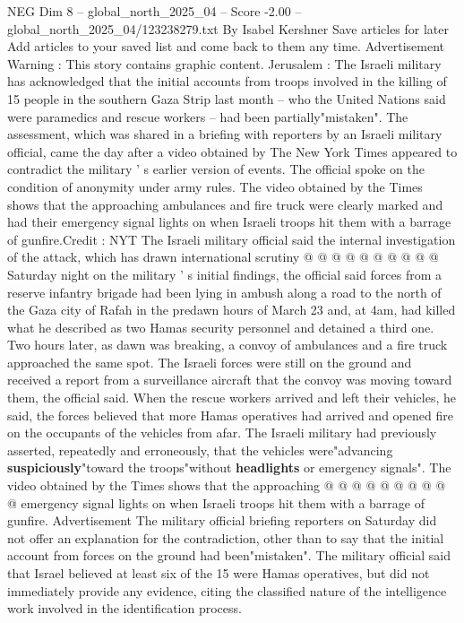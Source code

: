 \begin{textsample}{NEG Dim 8 – global\_north\_2025\_04 – Score -2.00 – global\_north\_2025\_04/123238279.txt}  \label{ex:f8_neg_082}
By Isabel Kershner Save articles for later Add articles to your saved list and come back to them any time.
Advertisement Warning : This story contains graphic content.
Jerusalem : The Israeli military has acknowledged that the initial accounts from troops involved in the killing of 15 people in the southern Gaza Strip last month -- who the United Nations said were paramedics and rescue workers -- had been partially"mistaken".
The assessment, which was shared in a briefing with reporters by an Israeli military official, came the day after a video obtained by The New York Times appeared to contradict the military ' s earlier version of events.
The official spoke on the condition of anonymity under army rules.
The video obtained by the Times shows that the approaching ambulances and fire truck were clearly marked and had their emergency signal lights on when Israeli troops hit them with a barrage of gunfire.Credit : NYT The Israeli military official said the internal investigation of the attack, which has drawn international scrutiny @ @ @ @ @ @ @ @ @ @ Saturday night on the military ' s initial findings, the official said forces from a reserve infantry brigade had been lying in ambush along a road to the north of the Gaza city of Rafah in the predawn hours of March 23 and, at 4am, had killed what he described as two Hamas security personnel and detained a third one.
Two hours later, as dawn was breaking, a convoy of ambulances and a fire truck approached the same spot.
The Israeli forces were still on the ground and received a report from a surveillance aircraft that the convoy was moving toward them, the official said.
When the rescue workers arrived and left their vehicles, he said, the forces believed that more Hamas operatives had arrived and opened fire on the occupants of the vehicles from afar.
The Israeli military had previously asserted, repeatedly and erroneously, that the vehicles were"advancing \textbf{suspiciously}"toward the troops"without \textbf{headlights} or emergency signals".
The video obtained by the Times shows that the approaching @ @ @ @ @ @ @ @ @ @ emergency signal lights on when Israeli troops hit them with a barrage of gunfire.
Advertisement The military official briefing reporters on Saturday did not offer an explanation for the contradiction, other than to say that the initial account from forces on the ground had been"mistaken".
The military official said that Israel believed at least six of the 15 were Hamas operatives, but did not immediately provide any evidence, citing the classified nature of the intelligence work involved in the identification process.

\end{textsample}
